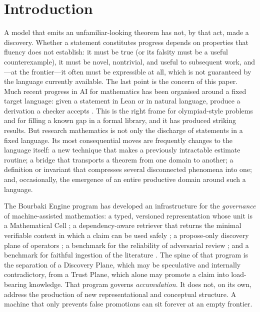 \documentclass[11pt]{article}
\theoremstyle{definition}
\theoremstyle{remark}
\begin{document}
\tableofcontents

\section{Introduction}
\label{sec:intro}

A model that emits an unfamiliar-looking theorem has not, by that act, made a discovery. Whether a
statement constitutes progress depends on properties that fluency does not establish: it must be
true (or its falsity must be a useful counterexample), it must be novel, nontrivial, and useful to
subsequent work, and---at the frontier---it often must be expressible at all, which is not
guaranteed by the language currently available. The last point is the concern of this paper.
Much recent progress in AI for mathematics has been organised around a fixed target language: given
a statement in Lean or in natural language, produce a derivation a checker accepts
\citep{polu2020,yang2023leandojo,trinh2024alphageom}. This is the right frame for olympiad-style
problems and for filling a known gap in a formal library, and it has produced striking results.
But research mathematics is not only the discharge of statements in a fixed language. Its most
consequential moves are frequently changes to the language itself: a new technique that makes a
previously intractable estimate routine; a bridge that transports a theorem from one domain to
another; a definition or invariant that compresses several disconnected phenomena into one; and,
occasionally, the emergence of an entire productive domain around such a language.

The Bourbaki Engine program \citep{lucius2026bourbaki} has developed an infrastructure for the
\emph{governance} of machine-assisted mathematics: a typed, versioned representation whose unit is
a Mathematical Cell \citep{lucius2026mirador}; a dependency-aware retriever that returns the
minimal verifiable context in which a claim can be used safely \citep{lucius2026proofcontext}; a
propose-only discovery plane of operators \citep{lucius2026theoryforge}; a benchmark for the
reliability of adversarial review \citep{lucius2026congressbench}; and a benchmark for faithful
ingestion of the literature \citep{lucius2026mathingest}. The spine of that program is the
separation of a Discovery Plane, which may be speculative and internally contradictory, from a
Trust Plane, which alone may promote a claim into load-bearing knowledge. That program governs
\emph{accumulation}. It does not, on its own, address the production of new representational and
conceptual structure. A machine that only prevents false promotions can sit forever at an empty
frontier.
\end{document}
